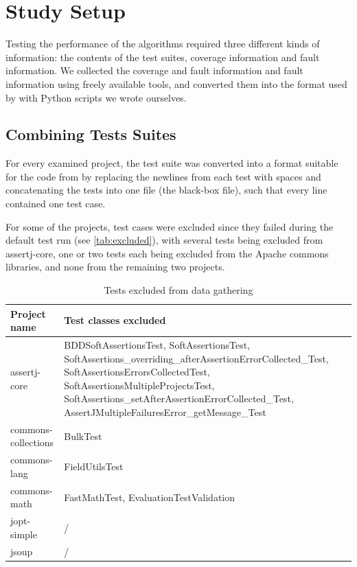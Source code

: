 \section{Study Setup}

Testing the performance of the algorithms required three different kinds
of information: the contents of the test suites, coverage information
and fault information. We collected the coverage and fault information
and fault information using freely available tools, and converted them
into the format used by \cite{cruciani2019scalable} with Python scripts
we wrote ourselves.

\subsection{Combining Tests Suites}

For every examined project, the test suite was converted into a format
suitable for the code from \cite{cruciani2019scalable} by replacing the
newlines from each test with spaces and concatenating the tests into one
file (the black-box file), such that every line contained one test case.

For some of the projects, test cases were excluded since they failed
during the default test run (see \autoref{tab:excluded}), with several
tests being excluded from assertj-core, one or two tests each being
excluded from the Apache commons libraries, and none from the remaining
two projects.

\begin{table}[htpb]
	\caption[Tests excluded]{Tests excluded from data gathering}\label{tab:excluded}
	\centering
	\begin{tabular}{l | p{10cm}}
		\toprule
		Project name & Test classes excluded \\
		\midrule
		assertj-core & BDDSoftAssertionsTest, SoftAssertionsTest, SoftAssertions\_overriding\_afterAssertionErrorCollected\_Test, SoftAssertionsErrorsCollectedTest, SoftAssertionsMultipleProjectsTest, SoftAssertions\_setAfterAssertionErrorCollected\_Test, AssertJMultipleFailuresError\_getMessage\_Test \\
		commons-collections & BulkTest \\
		commons-lang & FieldUtilsTest \\
		commons-math & FastMathTest, EvaluationTestValidation \\
		jopt-simple & / \\
		jsoup & / \\
		\bottomrule
	\end{tabular}
\end{table}

